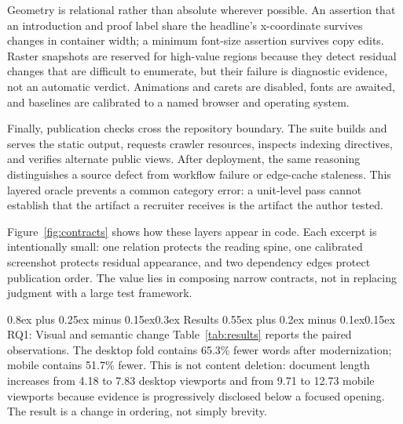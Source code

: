 \documentclass[9pt,twocolumn]{extarticle}
\makeatletter
\renewcommand{\section}{\@startsection{section}{1}{0pt}%
  {0.8ex plus 0.25ex minus 0.15ex}{0.3ex}%
  {\normalfont\large\bfseries\color{accent}}}
\renewcommand{\subsection}{\@startsection{subsection}{2}{0pt}%
  {0.55ex plus 0.2ex minus 0.1ex}{0.15ex}%
  {\normalfont\normalsize\bfseries}}
\makeatother
\begin{document}
Geometry is relational rather than absolute wherever possible. An assertion that an introduction and proof label share the headline's x-coordinate survives changes in container width; a minimum font-size assertion survives copy edits. Raster snapshots are reserved for high-value regions because they detect residual changes that are difficult to enumerate, but their failure is diagnostic evidence, not an automatic verdict. Animations and carets are disabled, fonts are awaited, and baselines are calibrated to a named browser and operating system.

Finally, publication checks cross the repository boundary. The suite builds and serves the static output, requests crawler resources, inspects indexing directives, and verifies alternate public views. After deployment, the same reasoning distinguishes a source defect from workflow failure or edge-cache staleness. This layered oracle prevents a common category error: a unit-level pass cannot establish that the artifact a recruiter receives is the artifact the author tested.

Figure~\ref{fig:contracts} shows how these layers appear in code. Each excerpt is intentionally small: one relation protects the reading spine, one calibrated screenshot protects residual appearance, and two dependency edges protect publication order. The value lies in composing narrow contracts, not in replacing judgment with a large test framework.

\section{Results}
\subsection{RQ1: Visual and semantic change}
Table~\ref{tab:results} reports the paired observations. The desktop fold contains 65.3\% fewer words after modernization; mobile contains 51.7\% fewer. This is not content deletion: document length increases from 4.18 to 7.83 desktop viewports and from 9.71 to 12.73 mobile viewports because evidence is progressively disclosed below a focused opening. The result is a change in ordering, not simply brevity.
\end{document}
